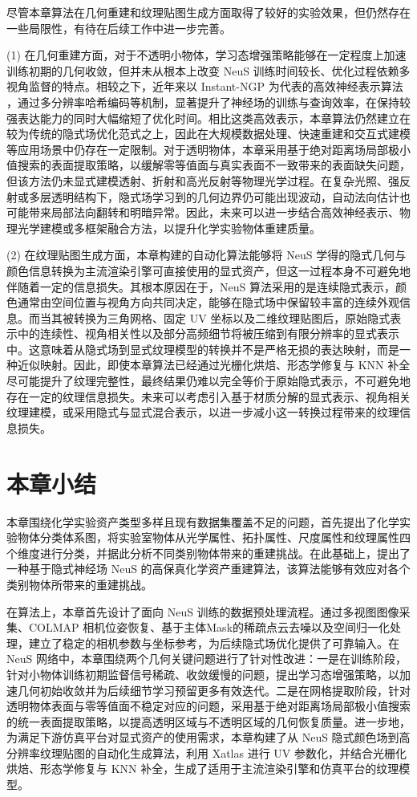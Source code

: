 尽管本章算法在几何重建和纹理贴图生成方面取得了较好的实验效果，但仍然存在一些局限性，有待在后续工作中进一步完善。

(1) 在几何重建方面，对于不透明小物体，学习态增强策略能够在一定程度上加速训练初期的几何收敛，但并未从根本上改变 NeuS 训练时间较长、优化过程依赖多视角监督的特点。相较之下，近年来以 Instant-NGP 为代表的高效神经表示算法\cite{muller2022instantngp,Li_2023_CVPR,Wang_2023_ICCV} ，通过多分辨率哈希编码等机制，显著提升了神经场的训练与查询效率，在保持较强表达能力的同时大幅缩短了优化时间。相比这类高效表示，本章算法仍然建立在较为传统的隐式场优化范式之上，因此在大规模数据处理、快速重建和交互式建模等应用场景中仍存在一定限制。对于透明物体，本章采用基于绝对距离场局部极小值搜索的表面提取策略，以缓解零等值面与真实表面不一致带来的表面缺失问题，但该方法仍未显式建模透射、折射和高光反射等物理光学过程。在复杂光照、强反射或多层透明结构下，隐式场学习到的几何边界仍可能出现波动，自动法向估计也可能带来局部法向翻转和明暗异常。因此，未来可以进一步结合高效神经表示、物理光学建模或多框架融合方法，以提升化学实验物体重建质量。

(2) 在纹理贴图生成方面，本章构建的自动化算法能够将 NeuS 学得的隐式几何与颜色信息转换为主流渲染引擎可直接使用的显式资产，但这一过程本身不可避免地伴随着一定的信息损失。其根本原因在于，NeuS 算法采用的是连续隐式表示，颜色通常由空间位置与视角方向共同决定，能够在隐式场中保留较丰富的连续外观信息。而当其被转换为三角网格、固定 UV 坐标以及二维纹理贴图后，原始隐式表示中的连续性、视角相关性以及部分高频细节将被压缩到有限分辨率的显式表示中。这意味着从隐式场到显式纹理模型的转换并不是严格无损的表达映射，而是一种近似映射。因此，即使本章算法已经通过光栅化烘焙、形态学修复与 KNN 补全尽可能提升了纹理完整性，最终结果仍难以完全等价于原始隐式表示，不可避免地存在一定的纹理信息损失。未来可以考虑引入基于材质分解的显式表示、视角相关纹理建模，或采用隐式与显式混合表示，以进一步减小这一转换过程带来的纹理信息损失。


\section{本章小结}

本章围绕化学实验资产类型多样且现有数据集覆盖不足的问题，首先提出了化学实验物体分类体系图，将实验室物体从光学属性、拓扑属性、尺度属性和纹理属性四个维度进行分类，并据此分析不同类别物体带来的重建挑战。在此基础上，提出了一种基于隐式神经场 NeuS 的高保真化学资产重建算法，该算法能够有效应对各个类别物体所带来的重建挑战。

在算法上，本章首先设计了面向 NeuS 训练的数据预处理流程。通过多视图图像采集、COLMAP 相机位姿恢复、基于主体Mask的稀疏点云去噪以及空间归一化处理，建立了稳定的相机参数与坐标参考，为后续隐式场优化提供了可靠输入。在NeuS 网络中，本章围绕两个几何关键问题进行了针对性改进：一是在训练阶段，针对小物体训练初期监督信号稀疏、收敛缓慢的问题，提出学习态增强策略，以加速几何初始收敛并为后续细节学习预留更多有效迭代。二是在网格提取阶段，针对透明物体表面与零等值面不稳定对应的问题，采用基于绝对距离场局部极小值搜索的统一表面提取策略，以提高透明区域与不透明区域的几何恢复质量。进一步地，为满足下游仿真平台对显式资产的使用需求，本章构建了从 NeuS 隐式颜色场到高分辨率纹理贴图的自动化生成算法，利用 Xatlas 进行 UV 参数化，并结合光栅化烘焙、形态学修复与 KNN 补全，生成了适用于主流渲染引擎和仿真平台的纹理模型。

